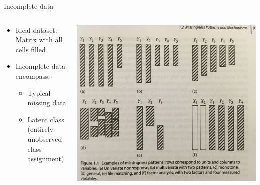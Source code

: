 \documentclass[dvipdfmx,bigger,aspectratio=169]{beamer}
\begin{document}
\begin{frame}[label={sec:orgf962357}]{Incomplete data}
\begin{columns}
\begin{column}{0.45\columnwidth}
\begin{itemize}
\item Ideal dataset: Matrix with all cells filled
\item Incomplete data encompass:
\begin{itemize}
\item Typical missing data
\item Latent class (entirely unobserved class assignment)
\end{itemize}
\end{itemize}
\end{column}

\begin{column}{0.45\columnwidth}
\begin{center}
\includegraphics[page=1,keepaspectratio,width=\textwidth,height=0.75\textheight]{./source/missing_patterns.png}
\end{center}
\scriptsize \cite{littleStatisticalAnalysisMissing2019} \normalsize
\end{column}
\end{columns}
\end{frame}
\end{document}
